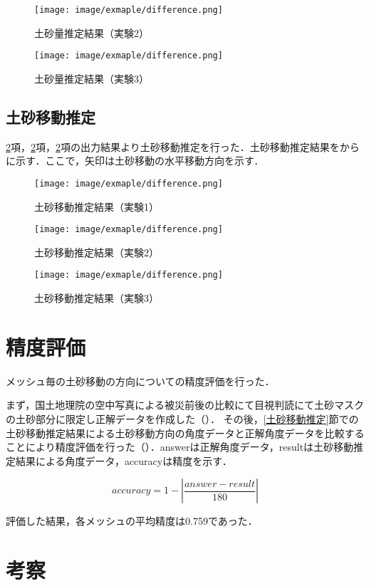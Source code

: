       \begin{figure}[t]
        \centering
        \texttt{[image: image/exmaple/difference.png]}
        \caption{土砂量推定結果（実験2）}
      \end{figure}

      \begin{figure}[t]
        \centering
        \texttt{[image: image/exmaple/difference.png]}
        \caption{土砂量推定結果（実験3）}
        \label{土砂量推定結果（実験3）}
      \end{figure}


    \subsection{土砂移動推定}
      \ref{}項，\ref{}項，\ref{}項の出力結果より土砂移動推定を行った．土砂移動推定結果をからに示す．ここで，矢印は土砂移動の水平移動方向を示す．

      \begin{figure}[t]
        \centering
        \texttt{[image: image/exmaple/difference.png]}
        \caption{土砂移動推定結果（実験1）}
        \label{土砂移動推定結果（実験1）}
      \end{figure}

      \begin{figure}[t]
        \centering
        \texttt{[image: image/exmaple/difference.png]}
        \caption{土砂移動推定結果（実験2）}
      \end{figure}

      \begin{figure}[t]
        \centering
        \texttt{[image: image/exmaple/difference.png]}
        \caption{土砂移動推定結果（実験3）}
        \label{土砂移動推定結果（実験3）}
      \end{figure}


  \section{精度評価}
    メッシュ毎の土砂移動の方向についての精度評価を行った．

    まず，国土地理院の空中写真による被災前後の比較\cite{国土地理院空撮画像1, 国土地理院空撮画像2}にて目視判読にて土砂マスクの土砂部分に限定し正解データを作成した（\fref{}）． その後，\ref{土砂移動推定}節での土砂移動推定結果による土砂移動方向の角度データと正解角度データを比較することにより精度評価を行った（）．answerは正解角度データ，resultは土砂移動推定結果による角度データ，accuracyは精度を示す．
    
    \begin{equation}
      \label{精度評価}
      accuracy = 1 - |\dfrac{answer - result} {180}|
    \end{equation}

    評価した結果，各メッシュの平均精度は0.759であった．


    
  \section{考察}
